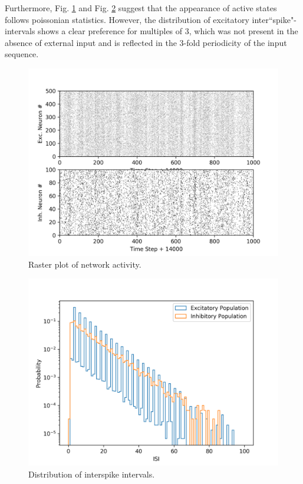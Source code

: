 \documentclass[10pt,a4paper]{article}
\begin{document}
Furthermore, Fig. \ref{fig:act_raster} and Fig. \ref{fig:isi_dist} suggest that the appearance of active states follows poissonian statistics. However, the distribution of excitatory inter``spike"-intervals shows a clear preference for multiples of 3, which was not present in the absence of external input and is reflected in the 3-fold periodicity of the input sequence. 

\begin{figure}
\includegraphics[width=\textwidth]{../../plots/act_raster.png}
\caption{\label{fig:act_raster} Raster plot of network activity.}
\end{figure}

\begin{figure}
\includegraphics[width=\textwidth]{../../plots/isi_dist.png}
\caption{\label{fig:isi_dist} Distribution of interspike intervals.}
\end{figure}
\end{document}
